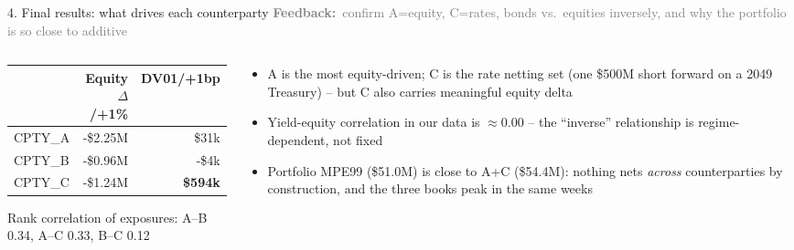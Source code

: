 \documentclass[9pt,aspectratio=169]{beamer}
\newcommand{\feedbacktag}[1]{{\small\textcolor{grey}{\textbf{Feedback:}~#1}}}
\begin{document}
\begin{frame}{4. Final results: what drives each counterparty}
  \feedbacktag{confirm A=equity, C=rates, bonds vs.\ equities inversely, and why the portfolio is so close to additive}
  \begin{columns}[T]
    \begin{column}{0.55\textwidth}
      \small
      \begin{tabular}{lrr}
        \toprule
        & \textbf{Equity $\Delta$/+1\%} & \textbf{DV01/+1bp} \\
        \midrule
        CPTY\_A & -\$2.25M & \$31k \\
        CPTY\_B & -\$0.96M & -\$4k \\
        CPTY\_C & -\$1.24M & \textbf{\$594k} \\
        \bottomrule
      \end{tabular}

      \vspace{8pt}
      \small
      Rank correlation of exposures: A--B 0.34, A--C 0.33, B--C 0.12
    \end{column}
    \begin{column}{0.45\textwidth}
      \small
      \begin{itemize}
        \item A is the most equity-driven; C is the rate netting set (one \$500M short forward on a 2049 Treasury) -- but C also carries meaningful equity delta
        \item Yield-equity correlation in our data is $\approx$0.00 -- the ``inverse'' relationship is regime-dependent, not fixed
        \item Portfolio MPE99 (\$51.0M) is close to A+C (\$54.4M): nothing nets \emph{across} counterparties by construction, and the three books peak in the same weeks
      \end{itemize}
    \end{column}
  \end{columns}
\end{frame}
\end{document}
